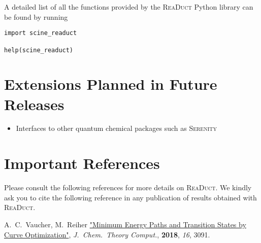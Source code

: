 \documentclass[]{tufte-book}
\begin{document}
A detailed list of all the functions provided by the \textsc{ReaDuct} Python library can be found by running
\begin{verbatim}
import scine_readuct

help(scine_readuct)
\end{verbatim}



\chapter{Extensions Planned in Future Releases}
\begin{itemize}
\item Interfaces to other quantum chemical packages such as \textsc{Serenity}\cite{serenity}
\end{itemize}


\chapter{Important References}

Please consult the following references for more details on \textsc{ReaDuct}.
We kindly ask you to cite the following reference in any publication of results obtained with \textsc{ReaDuct}.
\vspace{1.0cm}

A.~C.~Vaucher, M.~Reiher \href{https://pubs.acs.org/doi/10.1021/acs.jctc.8b00169}{"Minimum Energy Paths and Transition States by Curve Optimization"}, \textit{J.~Chem.~Theory Comput.}, \textbf{2018}, \textit{16}, 3091.




\backmatter




\end{document}
